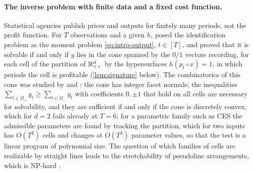 \paragraph{The inverse problem with finite data and a fixed cost function.}
Statistical agencies publish prices and outputs for finitely many periods, not the profit function. For $T$ observations and a given $h$, \citet{Shananin1999} posed the identification problem as the moment problem \eqref{eq:intro-output}, $t\in[T]$, and proved that it is solvable if and only if $y$ lies in the cone spanned by the $0/1$ vectors recording, for each cell of the partition of $\Rpp[d]$ by the hypersurfaces $h(p_t\circ x)=1$, in which periods the cell is profitable (\cref{lem:signature} below). The combinatorics of this cone was studied by \citet{AgaltsovMolchanovShananin2018} and \citet{Molchanov2013a,Molchanov2013b}: the cone has integer facet normals; the inequalities $\sum_{t\in\Omega_+}y_t\ge\sum_{t\in\Omega_-}y_t$ with coefficients $0,\pm1$ that hold on all cells are necessary for solvability, and they are sufficient if and only if the cone is discretely convex, which for $d=2$ fails already at $T=6$; for a parametric family such as CES the admissible parameters are found by tracking the partition, which for two inputs has $O(T^2)$ cells and changes at $O(T^3)$ parameter values, so that the test is a linear program of polynomial size. The question of which families of cells are realizable by straight lines leads to the stretchability of pseudoline arrangements, which is NP-hard \citep{Shor1991,Molchanov2013a}.

